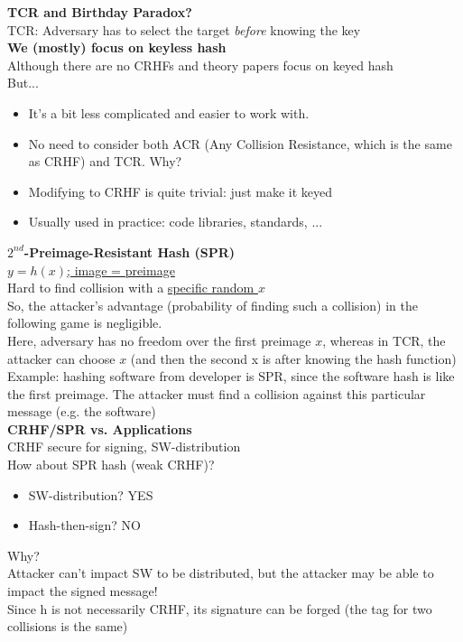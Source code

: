 \documentclass{article}
\begin{document}
\textbf{TCR and Birthday Paradox?}\\
TCR: Adversary has to select the target \textit{before} knowing the key\\

\textbf{We (mostly) focus on keyless hash}\\
Although there are no CRHFs and theory papers focus on keyed hash\\
But...\begin{itemize}
	\item It's a bit less complicated and easier to work with.
	\item No need to consider both ACR (Any Collision Resistance, which is the same as CRHF) and TCR. Why?
	\item Modifying to CRHF is quite trivial: just make it keyed
	\item Usually used in practice: code libraries, standards, ...
\end{itemize}

\textbf{$2^{nd}$-Preimage-Resistant Hash (SPR)}\\
\underline{$y = h(x)$; image = preimage}\\
Hard to find collision with a \underline{specific random $x$}\\
So, the attacker's advantage (probability of finding such a collision) in the following game is negligible.\\
Here, adversary has no freedom over the first preimage $x$, whereas in TCR, the attacker can choose $x$ (and then the second x is after knowing the hash function)\\
Example: hashing software from developer is SPR, since the software hash is like the first preimage. The attacker must find a collision against this particular message (e.g. the software)\\

\textbf{CRHF/SPR vs. Applications}\\
CRHF secure for signing, SW-distribution\\
How about SPR hash (weak CRHF)?\begin{itemize}
	\item SW-distribution? YES
	\item Hash-then-sign? NO
\end{itemize}
Why?\\
Attacker can't impact SW to be distributed, but the attacker may be able to impact the signed message!\\
Since h is not necessarily CRHF, its signature can be forged (the tag for two collisions is the same)\\
\end{document}
